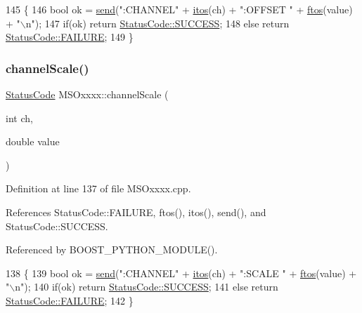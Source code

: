 \begin{DoxyCode}
145 \{
146     \textcolor{keywordtype}{bool} ok = \hyperlink{classMSOxxxx_ae77668a1ae4ccb74e0ed5f2485dfdebf}{send}(\textcolor{stringliteral}{":CHANNEL"} + \hyperlink{Tools_8h_af330027dbdafb9a30768b3613c553e60}{itos}(ch) + \textcolor{stringliteral}{":OFFSET "} + \hyperlink{classMSOxxxx_ab9c897c3dc0a52cbe5a5da67fc520ed7}{ftos}(value) + \textcolor{stringliteral}{"\(\backslash\)n"});
147     \textcolor{keywordflow}{if}(ok)  \textcolor{keywordflow}{return} \hyperlink{classStatusCode_a6f565cbeadc76d14c72f047e5e85eb4badd0da38d3ba0d922efd1f4619bc37ad8}{StatusCode::SUCCESS};
148     \textcolor{keywordflow}{else}        \textcolor{keywordflow}{return} \hyperlink{classStatusCode_a6f565cbeadc76d14c72f047e5e85eb4ba3da73d4c469762eb9d3c960368252b26}{StatusCode::FAILURE};
149 \}
\end{DoxyCode}
\mbox{\label{classMSOxxxx_ae08131dd88d4d7f95e870b69b2f5e0e6}} 
\subsubsection{\texorpdfstring{channel\+Scale()}{channelScale()}}
{\footnotesize\ttfamily \hyperlink{classStatusCode}{Status\+Code} M\+S\+Oxxxx\+::channel\+Scale (\begin{DoxyParamCaption}\item[{int}]{ch,  }\item[{double}]{value }\end{DoxyParamCaption})}



Definition at line 137 of file M\+S\+Oxxxx.\+cpp.



References Status\+Code\+::\+F\+A\+I\+L\+U\+RE, ftos(), itos(), send(), and Status\+Code\+::\+S\+U\+C\+C\+E\+SS.



Referenced by B\+O\+O\+S\+T\+\_\+\+P\+Y\+T\+H\+O\+N\+\_\+\+M\+O\+D\+U\+L\+E().


\begin{DoxyCode}
138 \{
139     \textcolor{keywordtype}{bool} ok = \hyperlink{classMSOxxxx_ae77668a1ae4ccb74e0ed5f2485dfdebf}{send}(\textcolor{stringliteral}{":CHANNEL"} + \hyperlink{Tools_8h_af330027dbdafb9a30768b3613c553e60}{itos}(ch) + \textcolor{stringliteral}{":SCALE "} + \hyperlink{classMSOxxxx_ab9c897c3dc0a52cbe5a5da67fc520ed7}{ftos}(value) + \textcolor{stringliteral}{"\(\backslash\)n"});
140     \textcolor{keywordflow}{if}(ok)  \textcolor{keywordflow}{return} \hyperlink{classStatusCode_a6f565cbeadc76d14c72f047e5e85eb4badd0da38d3ba0d922efd1f4619bc37ad8}{StatusCode::SUCCESS};
141     \textcolor{keywordflow}{else}        \textcolor{keywordflow}{return} \hyperlink{classStatusCode_a6f565cbeadc76d14c72f047e5e85eb4ba3da73d4c469762eb9d3c960368252b26}{StatusCode::FAILURE};
142 \}
\end{DoxyCode}
\mbox{\label{classHierarchy_a1e207f973c694b538bf90107b4868817}} 
